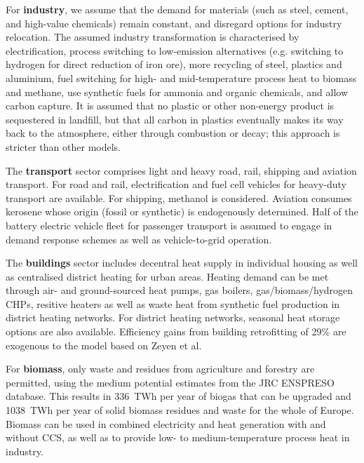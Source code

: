 For \textbf{industry}, we assume that the demand for materials (such as steel,
cement, and high-value chemicals) remain constant, and disregard options for
industry relocation. The assumed industry transformation is characterised by
electrification, process switching to low-emission alternatives (e.g. switching
to hydrogen for direct reduction of iron ore\cite{voglAssessmentHydrogen2018}),
more recycling of steel, plastics and aluminium\cite{circular_economy}, fuel
switching for high- and mid-temperature process heat to biomass and methane, use
synthetic fuels for ammonia and organic chemicals, and allow carbon capture. It
is assumed that no plastic or other non-energy product is sequestered in
landfill, but that all carbon in plastics eventually makes its way back to the
atmosphere, either through combustion or decay; this approach is stricter than
other models.
\cite{in-depth_2018}

The \textbf{transport} sector comprises light and heavy road, rail, shipping and
aviation transport. For road and rail, electrification and fuel cell vehicles
for heavy-duty transport are available. For shipping, methanol is considered.
Aviation consumes kerosene whose origin (fossil or synthetic) is endogenously
determined. Half of the battery electric vehicle fleet for passenger transport
is assumed to engage in demand response schemes as well as vehicle-to-grid
operation.

The \textbf{buildings} sector includes decentral heat supply in individual
housing as well as centralised district heating for urban areas. Heating demand
can be met through air- and ground-sourced heat pumps, gas boilers,
gas/biomass/hydrogen CHPs, resitive heaters as well as waste heat from synthetic
fuel production in district heating networks. For district heating networks,
seasonal heat storage options are also available. Efficiency gains from building
retrofitting of 29\% are exogenous to the model based on Zeyen et
al.\cite{zeyenMitigatingHeat2021}

For \textbf{biomass}, only waste and residues from agriculture and forestry are
permitted, using the medium potential estimates from the JRC ENSPRESO database.
\cite{ruizENSPRESOOpen2019} This results in 336~TWh per year of biogas that can
be upgraded and 1038~TWh per year of solid biomass residues and waste for the
whole of Europe. Biomass can be used in combined electricity and heat generation
with and without CCS, as well as to provide low- to medium-temperature process
heat in industry.

